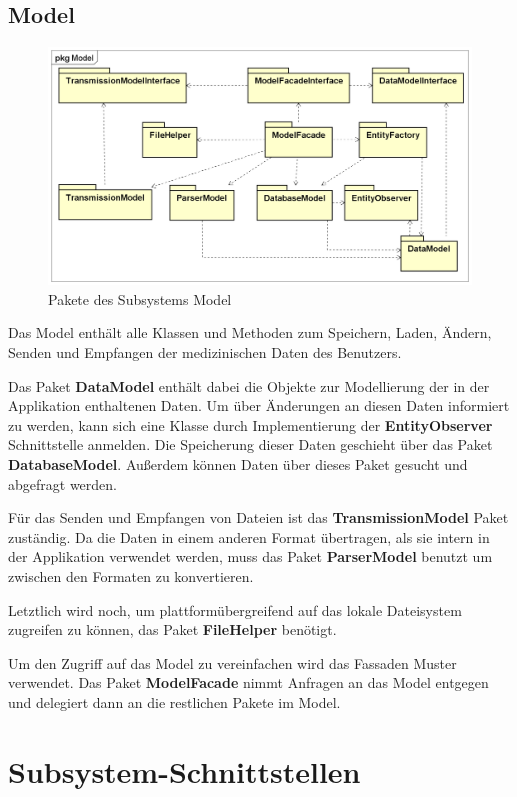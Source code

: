 \documentclass[a4paper]{scrreprt}
\begin{document}
\subsection{Model}
\begin{figure}[H]
\centering
\includegraphics[width=0.75\textheight]{graphics/Klassendiagramme/Model/ModelPackage.png}
\caption{Pakete des Subsystems Model}
\end{figure}
Das Model enthält alle Klassen und Methoden zum Speichern, Laden, Ändern, Senden und Empfangen der medizinischen Daten des Benutzers. 

Das Paket \textbf{DataModel} enthält dabei die Objekte zur Modellierung der in der Applikation enthaltenen Daten. Um über Änderungen an diesen Daten informiert zu werden, kann sich eine Klasse durch Implementierung der \textbf{EntityObserver} Schnittstelle anmelden.
Die Speicherung dieser Daten geschieht über das Paket \textbf{DatabaseModel}. Außerdem 
können Daten über dieses Paket gesucht und abgefragt werden.

Für das Senden und Empfangen von Dateien ist das \textbf{TransmissionModel} Paket zuständig.
Da die Daten in einem anderen Format übertragen, als sie intern in der Applikation verwendet werden, muss das Paket \textbf{ParserModel} benutzt um zwischen den Formaten zu konvertieren.

Letztlich wird noch, um plattformübergreifend auf das lokale Dateisystem zugreifen zu können, das Paket \textbf{FileHelper} benötigt.

Um den Zugriff auf das Model zu vereinfachen wird das Fassaden Muster verwendet. Das Paket \textbf{ModelFacade} nimmt Anfragen an das Model entgegen und delegiert dann an die restlichen Pakete im Model.

\section{Subsystem-Schnittstellen}
\end{document}
